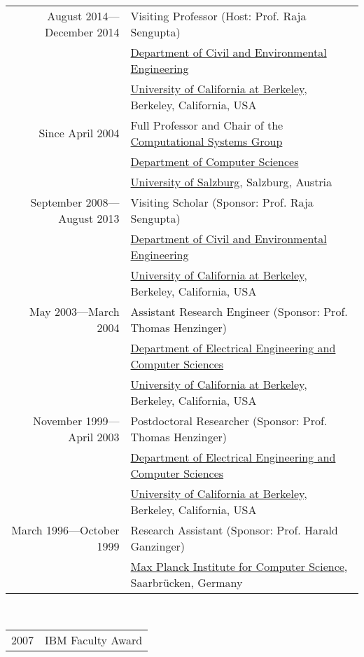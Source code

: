 \\
\begin{tabular}{rl}
August 2014---December 2014 & Visiting Professor (Host: Prof. Raja Sengupta)\\
                     & \href{http://www.ce.berkeley.edu}{Department of Civil and Environmental Engineering} \\
                     & \href{http://www.berkeley.edu}{University of California at Berkeley}, Berkeley, California, USA \\
\noalign{\smallskip}
Since April 2004 & Full Professor and Chair of the \href{http://www.cs.uni-salzburg.at/~ck/group}{Computational Systems Group} \\ %
                 & \href{http://www.cs.uni-salzburg.at}{Department of Computer Sciences} \\
                 & \href{http://www.sbg.ac.at}{University of Salzburg}, Salzburg, Austria \\
\noalign{\smallskip}
September 2008---August 2013 & Visiting Scholar (Sponsor: Prof. Raja Sengupta)\\
                     & \href{http://www.ce.berkeley.edu}{Department of Civil and Environmental Engineering} \\
                     & \href{http://www.berkeley.edu}{University of California at Berkeley}, Berkeley, California, USA \\
\noalign{\smallskip}
May 2003---March 2004 & Assistant Research Engineer (Sponsor: Prof. Thomas Henzinger)\\
                 & \href{http://www.eecs.berkeley.edu}{Department of Electrical Engineering and Computer Sciences} \\
                 & \href{http://www.berkeley.edu}{University of California at Berkeley}, Berkeley, California, USA \\
\noalign{\smallskip}
November 1999---April 2003 & Postdoctoral Researcher (Sponsor: Prof. Thomas Henzinger)\\
                 & \href{http://www.eecs.berkeley.edu}{Department of Electrical Engineering and Computer Sciences} \\
                 & \href{http://www.berkeley.edu}{University of California at Berkeley}, Berkeley, California, USA \\
\noalign{\smallskip}
March 1996---October 1999 & Research Assistant (Sponsor: Prof. Harald Ganzinger)\\
                 & \href{http://www.mpi-sb.mpg.de}{Max Planck Institute for Computer Science}, Saarbr{\"u}cken, Germany \\
\end{tabular}

 \\
\begin{tabular}{rl}
2007 & IBM Faculty Award
\end{tabular}

\newpage

